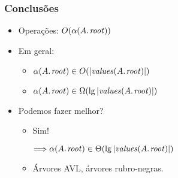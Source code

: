 \documentclass{beamer}
\begin{document}
\begin{frame}

  \frametitle{Conclusões}

  \begin{itemize}

    \item Operações: $O(\alpha(\attrib{A}{root}))$

    \item Em geral:

      \begin{itemize}
      \item $\alpha(\attrib{A}{root}) \in O( | \id{values}(\attrib{A}{root}) |)$

      \item $\alpha(\attrib{A}{root}) \in \Omega( \lg | \id{values}(\attrib{A}{root}) |)$
      \end{itemize}

    \item Podemos fazer melhor?

      \pause

      \begin{itemize}

        \item \alert{Sim!}

          $\Longrightarrow \alpha(\attrib{A}{root}) \in \Theta( \lg | \id{values}(\attrib{A}{root}) |)$ 

          \item Árvores AVL, árvores rubro-negras.

      \end{itemize}
  \end{itemize}

\end{frame}
\end{document}
